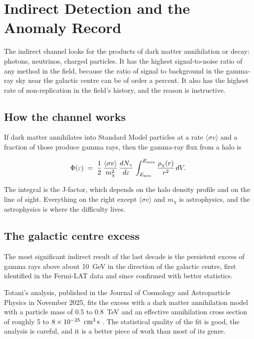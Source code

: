 
\chapter{Indirect Detection and the Anomaly Record}
\label{ch:indirect}

The indirect channel looks for the products of dark matter annihilation or
decay: photons, neutrinos, charged particles. It has the highest
signal-to-noise ratio of any method in the field, because the ratio of
signal to background in the gamma-ray sky near the galactic centre can be
of order a percent. It also has the highest rate of non-replication in the
field's history, and the reason is instructive.

\section{How the channel works}If dark matter annihilates into Standard Model
particles at a rate $\langle\sigma v\rangle$ and a fraction of those
produce gamma rays, then the gamma-ray flux from a halo is

\[
\Phi(\varepsilon) \;=\; \frac{1}{2}\,
\frac{\langle \sigma v\rangle}{m_\chi^2}\,
\frac{dN_\gamma}{d\varepsilon}\,
\int_{E_{\rm min}}^{E_{\rm max}} \frac{\rho_\chi(r)}{r^2}\,dV .
\]

The integral is the J-factor, which depends on the halo density profile and
on the line of sight. Everything on the right except $\langle\sigma v\rangle$
and $m_\chi$ is astrophysics, and the astrophysics is where the difficulty
lives.

\section{The galactic centre excess}The most significant indirect result of the last
decade is the persistent excess of gamma rays above about 10~GeV in the
direction of the galactic centre, first identified in the Fermi-LAT data and
since confirmed with better statistics.

Totani's analysis, published in the Journal of Cosmology and Astroparticle
Physics in November 2025, fits the excess with a dark matter annihilation
model with a particle mass of 0.5 to 0.8~TeV and an effective annihilation
cross section of roughly 5 to $8\times 10^{-25}\ \,\mathrm{cm}^{3}\,\mathrm{s}$
. The statistical quality of the fit is good, the analysis is
careful, and it is a better piece of work than most of its genre.

